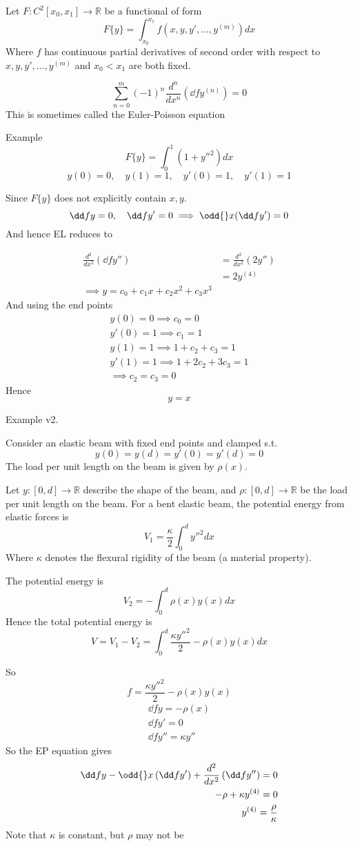 \documentclass{E:/Documents/Latex/myassignment}
\begin{document}
Let $F : C^2[x_0,x_1] \to \mathbb{R}$ be a functional of form
\[F\{y\} = \int_{x_0}^{x_1} f(x,y,y',\ldots,y^{(m)}) dx\]
Where $f$ has continuous partial derivatives of second order with respect to $x,y,y',\ldots,y^{(m)}$ and $x_0<x_1$ are both fixed.

\[\sum_{n=0}^{m} (-1)^n\frac{d^n}{dx^n} \left(\dd f{y^{(n)}}\right) = 0\]
This is sometimes called the Euler-Poisson equation


Example
\[F\{y\} = \int_0^1 (1+y''^2) dx\]
\[y(0) = 0, \quad y(1) = 1,\quad y'(0) = 1,\quad y'(1) = 1\]

Since $F\{y\}$ does not explicitly contain $x,y$.
\[\dd fy = 0, \quad \dd f{y'} = 0 \implies \odd{}x (\dd f{y'}) = 0\]
And hence EL reduces to

\begin{align*}
	\frac{d^2}{dx^2} \left(\dd f{y''}\right) &= \frac{d^2}{dx^2} (2y'')\\
	&= 2y^{(4)}\\
	\implies y = c_0 + c_1 x + c_2x^2 + c_3x^3
\end{align*}
And using the end points
\begin{align*}
	y(0) = 0 \implies c_0 = 0\\
	y'(0) = 1 \implies c_1 = 1\\
	y(1) = 1 \implies 1 + c_2 + c_3 = 1\\
	y'(1) = 1 \implies 1 + 2c_2 + 3c_3 = 1\\
	\implies c_2=c_3 = 0
\end{align*}
Hence
\[y = x\]

Example v2.

Consider an elastic beam with fixed end points and clamped s.t.
\[y(0) = y(d) = y'(0) = y'(d) = 0\]
The load per unit length on the beam is given by $\rho(x)$.

Let $y : [0,d] \to \mathbb{R}$ describe the shape of the beam, and $\rho : [0,d] \to \mathbb{R}$ be the load per unit length on the beam. For a bent elastic beam, the potential energy from elastic forces is
\[V_1 = \frac{\kappa}{2} \int_0^d y''^2 dx\]
Where $\kappa$ denotes the flexural rigidity of the beam (a material property).

The potential energy is
\[V_2 = - \int_0^d \rho (x) y (x) dx\]
Hence the total potential energy is
\[V = V_1 - V_2 = \int_0^d \frac{\kappa y''^2}{2} - \rho(x) y(x) dx\]

So 
\[f = \frac{\kappa y''^2}{2} - \rho(x) y(x) \]
\begin{align*}
	\dd fy = - \rho(x)\\
	\dd fy' = 0\\
	\dd fy'' = \kappa y''
\end{align*}
So the EP equation gives
\begin{align*}
	\dd fy - \odd{}x \left(\dd f{y'}\right) + \frac{d^2}{dx^2}\left(\dd f{y''}\right) = 0\\
	-\rho + \kappa y^{(4)} = 0\\
	y^{(4)} = \frac{\rho}{\kappa}
\end{align*}
Note that $\kappa$ is constant, but $\rho$ may not be
\end{document}
